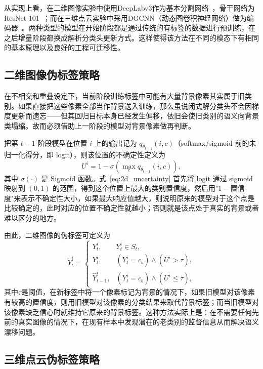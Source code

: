 从实现上看，在二维图像实验中使用DeepLabv3作为基本分割网络~\citep{chen2017deeplabv3}，骨干网络为ResNet-101~\citep{he2016resnet}；而在三维点云实验中采用DGCNN（动态图卷积神经网络）做为编码器~\citep{wang2019dgcnn}。两种类型的模型在开始阶段都是通过传统的有标签的数据进行预训练，在之后增量阶段都换成解析分类头更新方式。这样使得该方法在不同的模态下有相同的基本原理以及良好的工程可迁移性。

\subsection{二维图像伪标签策略}

在不相交和重叠设定下，当前阶段训练标签中可能有大量背景像素其实属于旧类别。如果直接把这些像素全部当作背景送入训练，那么虽说闭式解分类头不会因梯度更新而遗忘——但其回归目标本身已经发生偏移，依旧会使旧类别的语义向背景类塌缩。故而必须借助上一阶段的模型对背景像素做再判断。

把第 $t-1$ 阶段模型在位置 $i$ 上的输出记为 $q_{\theta_{t-1}}(i,c)$（softmax/sigmoid 前的未归一化得分，即 logit），则该位置的不确定性定义为
\begin{equation}
U^{i} = 1 - \sigma\left(\max_c q_{\theta_{t-1}}(i,c)\right),
\label{eq:2d_uncertainty}
\end{equation}
其中 $\sigma(\cdot)$ 是 Sigmoid 函数。式~\eqref{eq:2d_uncertainty} 首先将 logit 通过 sigmoid 映射到 $(0,1)$ 的范围，得到这个位置上最大的类别置信度，然后用"$1-$置信度"来表示不确定性大小，如果最大响应值越大，则说明原来的模型对于这个点是比较确定的，此时对应的位置不确定性就越小；否则就是该点处于真实的背景或者难以区分的地方。

由此，二维图像的伪标签可定义为
\begin{equation}
\tilde{Y}_t^{i}=
\begin{cases}
Y_t^{i}, & Y_t^{i} \in S_t, \\
Y_t^{i}, & (Y_t^{i}=c_b) \wedge (U^{i} > \tau), \\
\hat{Y}_{t-1}^{i}, & (Y_t^{i}=c_b) \wedge (U^{i} \leq \tau),
\end{cases}
\label{eq:2d_pseudo}
\end{equation}
其中$\tau$是阈值，在新标签中将一个像素标记为背景的情况下，如果旧模型对该像素有较高的置信度，则用旧模型对该像素的分类结果来取代背景标签；而当旧模型对该像素缺乏信心时就维持它原来的背景标签。这种方法实际上是：在不需要任何先前的真实图像的情况下，在现有样本中发现潜在的老类别的监督信息从而解决语义漂移问题。

\subsection{三维点云伪标签策略}

